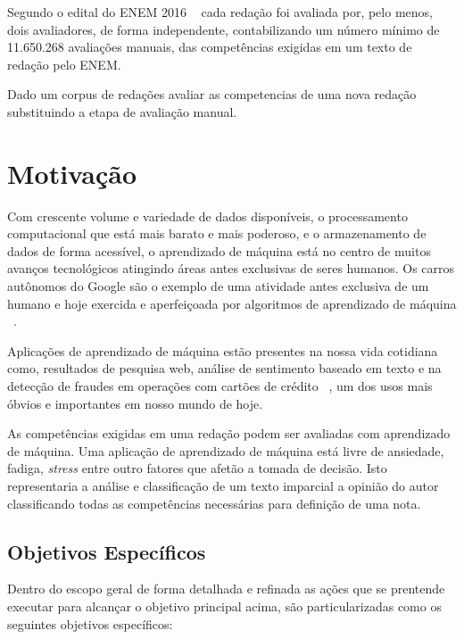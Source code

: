 Segundo o edital do ENEM 2016 ~\cite{edital_enem:2016} cada redação foi avaliada por, pelo menos, dois avaliadores, de forma independente, contabilizando um número mínimo de 11.650.268 avaliações manuais, das competências exigidas em um texto de redação pelo ENEM.

Dado um corpus de redações avaliar as competencias de uma nova redação substituindo a etapa de avaliação manual.

\section{Motivação}

Com crescente volume e variedade de dados disponíveis, o processamento computacional que está mais barato e mais poderoso, e o armazenamento de dados de forma acessível, o aprendizado de máquina está no centro de muitos avanços tecnológicos atingindo áreas antes exclusivas de seres humanos. Os carros autônomos do Google são o exemplo de uma atividade antes exclusiva de um humano e hoje exercida e aperfeiçoada por algoritmos de aprendizado de máquina ~\cite{waymo:2017}.

Aplicações de aprendizado de máquina estão presentes na nossa vida cotidiana como, resultados de pesquisa web, análise de sentimento baseado em texto e na detecção de fraudes em operações com cartões de crédito ~\cite{batista1999aplicando}, um dos usos mais óbvios e importantes em nosso mundo de hoje.

As competências exigidas em uma redação podem ser avaliadas com aprendizado de máquina. Uma aplicação de aprendizado de máquina está livre de ansiedade, fadiga, \textit{stress} entre outro fatores que afetão a tomada de decisão. Isto representaria a análise e classificação de um texto imparcial a opinião do autor classificando todas as competências necessárias para definição de uma nota.

\subsection{Objetivos Específicos}

Dentro do escopo geral de forma detalhada e refinada as ações que se prentende executar para alcançar o objetivo principal acima, são particularizadas como os seguintes objetivos específicos:


